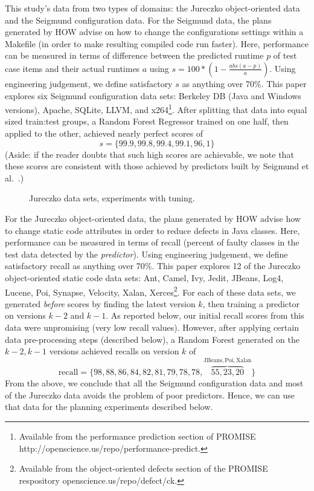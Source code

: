 \documentclass[conference]{IEEEtran}
\begin{document}
This study's data from two types of domains: the Jureczko   object-oriented data  
and the Seigmund configuration data. 
For the Seigmund data, the plans generated by HOW advise on how  to change the   configurations settings within a Makefile
(in order to make resulting compiled
code  run faster). Here, performance can be measured in terms of  difference
between the predicted runtime $p$ of test case items and their actual runtimes $a$
using  $s= 100*(1- \frac{abs(a - p)}{a})$.
Using engineering judgement, we define satisfactory $s$ as anything over   70\%. 
This paper  explores    six Seigmund configuration data sets:  Berkeley DB (Java and Windows versions), Apache, SQLite, LLVM, and
  x264\footnote{Available from the performance prediction section of PROMISE
  http://openscience.us/repo/performance-predict.}. 
  After splitting that data into equal sized train:test groups, a Random Forest
  Regressor trained on one half, then applied to the other, achieved nearly perfect scores of
\[s=\{99.9, 99.8, 99.4, 99.1, 96,1\}\]
(Aside: if the reader doubts that such high scores are achievable, we note that these scores are 
consistent with those achieved by predictors built by Seigmund et al.~\cite{sven12}.)

\begin{figure}

\caption{Jureczko data sets, experiments with tuning.}\label{fig:jtune}
\end{figure}
For the  Jureczko   object-oriented data,
the plans generated by HOW advise   how to change static code attributes in order to reduce defects in
Java classes.  Here,
performance can be measured in terms of recall (percent of faulty classes in
the test data detected
by the {\em predictor}). Using engineering judgement, we define satisfactory recall as anything over   70\%. 
This paper explores 12 of the Jureczko   object-oriented static code data sets: Ant, Camel, Ivy, Jedit, JBeans, Log4, Lucene, Poi, Synapse, Velocity, Xalan, Xerces\footnote{Available from the object-oriented defects section of the PROMISE respository openscience.us/repo/defect/ck.}.
For each of these data sets, we generated  {\em before} scores  by finding the latest
version $k$, then training  a predictor on versions $k-2$ and $k-1$. As reported below,
our initial recall scores from this data were unpromising (very low recall values). However,
after applying certain data pre-processing steps (described below), a Random Forest generated
on the $k-2,k-1$ versions achieved recalls on version $k$ of
\[\mathrm{recall}=\{98,88,86,84,82,81,79,78,78,\overbrace{55,23,20}^{\mathrm{JBeans,Poi,Xalan}}\}\]
From the above, we conclude that all the Seigmund configuration data and most of the Jureczko data
avoids the problem of poor predictors. Hence, we can use that data for the planning
experiments described below.
 
\end{document}
